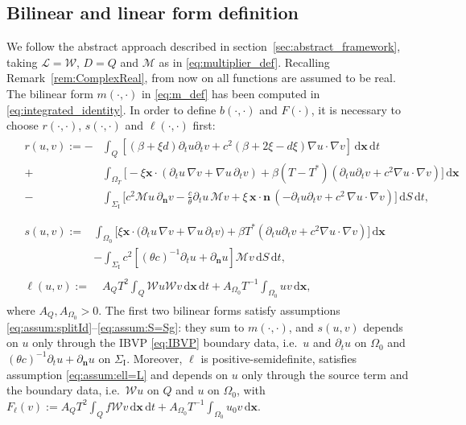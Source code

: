 \documentclass[a4paper]{article}
\theoremstyle{plain}
\theoremstyle{definition}
\newcommand{\operator}[1]{\mathcal{#1}}
\newcommand{\dx}{{\,\mathrm{d}\vect x}}
\newcommand{\dt}{{\,\mathrm{d}t}}
\newcommand{\dS}{{\,\mathrm{d}S}}
\newcommand{\Grad}[1]{\nabla #1}
\newcommand{\TimeDer}{{\partial^{}_t}}
\newcommand{\NormDer}{{\partial_{\bm{n}}}}
\newcommand{\vect}[1]{\bm{#1}}
\newcommand{\SI}{{\Sigma_{\mathrm I}}}
\newcommand{\oL}{{\operator{L}}}
\newcommand{\oW}{{\operator{W}}}
\newcommand{\OZ}{{\Omega_0}}
\begin{document}
\subsection{Bilinear and linear form definition}\label{sec:forms}
We follow the abstract approach described in section~\ref{sec:abstract_framework}, taking $\oL=\oW$, $D=Q$ and $\operator M$ as in \eqref{eq:multiplier_def}.
Recalling Remark~\ref{rem:ComplexReal}, from now on all functions are assumed to be real.
The bilinear form $m(\cdot,\cdot)$ in \eqref{eq:m_def} has been computed in \eqref{eq:integrated_identity}.
In order to define $b(\cdot,\cdot)$ and $F(\cdot)$, it is necessary to choose $r(\cdot,\cdot)$, $s(\cdot,\cdot)$ and $\ell(\cdot, \cdot)$ first:
\begin{align}	\label{eq:r_def}
	 & \begin{aligned}
		   r(u,v) := - & \int_Q \left[
			   (\beta + \xi d)\TimeDer{u}\TimeDer{v} + c^2  (\beta + 2 \xi - d\xi)\Grad u \cdot \Grad v
		   \right] \dx \dt                                                                                              \\
+           & \int_{\Omega_T} \big[-\xi \vect x \cdot (  \TimeDer{u} \,\Grad v+ \Grad u\, \TimeDer{v} )
+\beta (T-T^*)(\TimeDer{u} \TimeDer{v} + c^2 \Grad u \cdot \Grad v)\big] \dx                              \\
-           & \int_{\SI} \big[c^2 \operator{M} u\,\NormDer{v} -\frac{c}{\theta} \TimeDer{u}\, \operator{M} v
		   + \xi \,\vect x \cdot \vect{n}\,(-\TimeDer{u} \TimeDer{v}+  c^2\,\Grad u \cdot \Grad v)\big] \dS\dt,   \\
	   \end{aligned}        \\
\label{eq:s_def}
	 & \begin{aligned}
		   s(u,v) := & \int_{\Omega_0} \big[ \xi \vect x \cdot \big( \TimeDer{u} \,\Grad v+ \Grad u \,\TimeDer{v}\big)
		   +\beta T^* \left(\TimeDer{u} \TimeDer{v} + c^2 \Grad u \cdot \Grad v\right)\big] \dx                        \\
& -  \int_{\SI} c^2 \left[(\theta c)^{-1} \TimeDer{u} + \NormDer{u}\right]\operator{M} v  \dS \dt,
	   \end{aligned} \\
	\label{eq:ell_def}
	 & \begin{aligned}
		   \ell(u,v) := \; & A_QT^2\int_Q \oW u \oW v \dx \dt + A_\OZ T^{-1}\int_{\OZ} u v \dx,
	   \end{aligned}
\end{align}
where $A_Q, A_\OZ > 0$.
The first two bilinear forms satisfy assumptions \eqref{eq:assum:splitId}--\eqref{eq:assum:S=Sg}: they sum to $m(\cdot,\cdot)$, and $s(u,v)$ depends on $u$ only through the IBVP \eqref{eq:IBVP} boundary data, i.e.\ $u$ and $\TimeDer u$ on $\OZ$ and $(\theta c)^{-1} \TimeDer{u} + \NormDer{u}$ on ${\SI}$.
Moreover, $\ell$ is positive-semidefinite, satisfies assumption \eqref{eq:assum:ell=L} and depends on $u$ only through the source term and the boundary data, i.e.\ $\oW u$ on $Q$ and $u$ on $\OZ$, with $F_\ell(v):= A_QT^2\int_Q f \oW v \dx \dt + A_\OZ T^{-1}\int_{\OZ} u_0 v \dx$.
\end{document}
